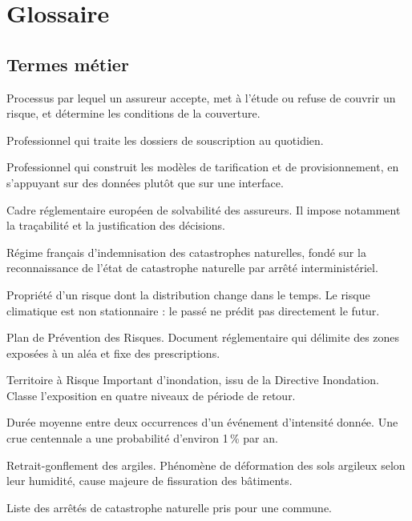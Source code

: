 \chapter{Glossaire}
\label{ann:glossaire}

\section{Termes métier}

\begin{description}[leftmargin=0em,style=nextline]
  \item[Souscription (\emph{underwriting}).] Processus par lequel un assureur
  accepte, met à l'étude ou refuse de couvrir un risque, et détermine les
  conditions de la couverture.
  \item[Souscripteur.] Professionnel qui traite les dossiers de souscription au
  quotidien.
  \item[Actuaire.] Professionnel qui construit les modèles de tarification et
  de provisionnement, en s'appuyant sur des données plutôt que sur une
  interface.
  \item[Solvabilité II.] Cadre réglementaire européen de solvabilité des
  assureurs. Il impose notamment la traçabilité et la justification des
  décisions.
  \item[Régime CatNat.] Régime français d'indemnisation des catastrophes
  naturelles, fondé sur la reconnaissance de l'état de catastrophe naturelle
  par arrêté interministériel.
  \item[Non-stationnarité.] Propriété d'un risque dont la distribution change
  dans le temps. Le risque climatique est non stationnaire : le passé ne prédit
  pas directement le futur.
  \item[PPR.] Plan de Prévention des Risques. Document réglementaire qui
  délimite des zones exposées à un aléa et fixe des prescriptions.
  \item[TRI.] Territoire à Risque Important d'inondation, issu de la Directive
  Inondation. Classe l'exposition en quatre niveaux de période de retour.
  \item[Période de retour.] Durée moyenne entre deux occurrences d'un événement
  d'intensité donnée. Une crue centennale a une probabilité d'environ 1\,\% par
  an.
  \item[RGA.] Retrait-gonflement des argiles. Phénomène de déformation des sols
  argileux selon leur humidité, cause majeure de fissuration des bâtiments.
  \item[CatNat historique.] Liste des arrêtés de catastrophe naturelle pris
  pour une commune.
\end{description}

